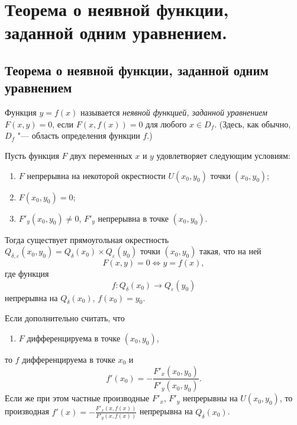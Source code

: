 \chapter[Теорема о неявной функции, заданной одним уравнением.]{Теорема о неявной функции, заданной одним уравнением.}

\section{Теорема о неявной функции, заданной одним уравнением}
\begin{defn}
Функция $y=f(x)$ называется \textit{неявной функцией, заданной уравнением} $F(x,y)=0$, если $F(x,f(x))=0$ для любого $x\in D_f$. (Здесь, как обычно, $D_f$ "--- область определения функции $f$.)
\end{defn}


\begin{thm} \label{th1}
Пусть функция $F$ двух переменных $x$ и $y$ удовлетворяет следующим условиям:
\begin{enumerate}
    \item[$1^\circ$] $F$ непрерывна на некоторой окрестности $U(x_0, y_0)$ точки $(x_0, y_0)$;
    \item[$2^\circ$] $F(x_0, y_0) = 0$;
    \item[$3^\circ$] $F'_y(x_0, y_0) \ne 0$, $F'_y$ непрерывна в точке $(x_0, y_0)$.
\end{enumerate}
Тогда существует прямоугольная окрестность $Q_{\delta, \varepsilon}(x_0, y_0) = Q_\delta(x_0) \times Q_\varepsilon(y_0)$ точки $(x_0, y_0)$ такая, что на ней
$$
F(x, y) = 0 \iff y = f(x),
$$
где функция
$$
f \colon Q_\delta(x_0) \to Q_\varepsilon(y_0)
$$
непрерывна на $Q_\delta(x_0)$, $f(x_0) = y_0$.

Если дополнительно считать, что
\begin{enumerate}
    \item[$4^\circ$] $F$ дифференцируема в точке $(x_0, y_0)$,
\end{enumerate}
то $f$ дифференцируема в точке $x_0$ и
$$
f'(x_0) = -\frac{F'_x(x_0, y_0)}{F'_y(x_0, y_0)}.
$$
Если же при этом частные производные $F'_x$, $F'_y$ непрерывны на $U(x_0, y_0)$, то производная $f'(x) = -\frac{F'_x(x, f(x))}{F'_y(x, f(x))}$ непрерывна на $Q_\delta(x_0)$.
\end{thm}

